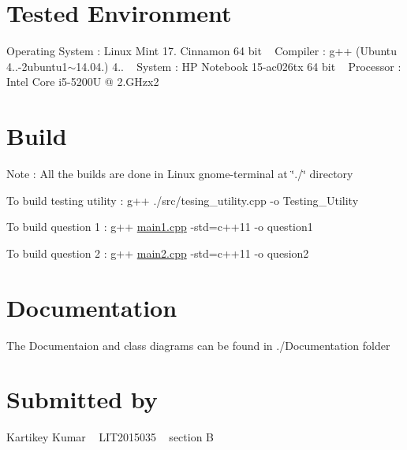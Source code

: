 \section*{Tested Environment}

Operating System \+: Linux Mint 17. Cinnamon 64 bit ~\newline
 Compiler \+: g++ (Ubuntu 4..-\/2ubuntu1$\sim$14.04.) 4.. ~\newline
 System \+: HP Notebook 15-\/ac026tx 64 bit ~\newline
 Processor \+: Intel Core i5-\/5200U @ 2.\+G\+Hzx2 ~\newline


\section*{Build}

Note \+: All the builds are done in Linux gnome-\/terminal at \char`\"{}./\char`\"{} directory

To build testing utility \+: g++ ./src/tesing\+\_\+utility.cpp -\/o Testing\+\_\+\+Utility

To build question 1 \+: g++ \hyperlink{main1_8cpp}{main1.\+cpp} -\/std=c++11 -\/o question1

To build question 2 \+: g++ \hyperlink{main2_8cpp}{main2.\+cpp} -\/std=c++11 -\/o quesion2

\section*{Documentation}

The Documentaion and class diagrams can be found in ./\+Documentation folder

\section*{Submitted by}

Kartikey Kumar ~\newline
 L\+I\+T2015035 ~\newline
 section \textquotesingle{}B\textquotesingle{} ~\newline
 